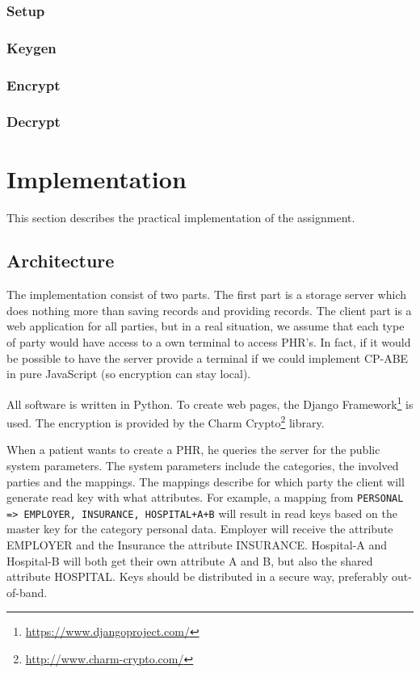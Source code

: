 \documentclass[a4paper]{article}
\begin{document}
		\subsubsection{Setup}
	
		\subsubsection{Keygen}
		
		\subsubsection{Encrypt}
		
		\subsubsection{Decrypt}
    
\section{Implementation}
	This section describes the practical implementation of the assignment.
	
	\subsection{Architecture}
		The implementation consist of two parts. The first part is a storage server which does nothing more than saving records and providing records. The client part is a web application for all parties, but in a real situation, we assume that each type of party would have access to a own terminal to access PHR's. In fact, if it would be possible to have the server provide a terminal if we could implement CP-ABE in pure JavaScript (so encryption can stay local).
		
		All software is written in Python. To create web pages, the Django Framework\footnote{\url{https://www.djangoproject.com/}} is used. The encryption is provided by the Charm Crypto\footnote{\url{http://www.charm-crypto.com/}} library.
	
		When a patient wants to create a PHR, he queries the server for the public system parameters. The system parameters include the categories, the involved parties and the mappings. The mappings describe for which party the client will generate read key with what attributes. For example, a mapping from \texttt{PERSONAL => EMPLOYER, INSURANCE, HOSPITAL+A+B} will result in read keys based on the master key for the category personal data. Employer will receive the attribute EMPLOYER and the Insurance the attribute INSURANCE. Hospital-A and Hospital-B will both get their own attribute A and B, but also the shared attribute HOSPITAL. Keys should be distributed in a secure way, preferably out-of-band.
		
\end{document}
